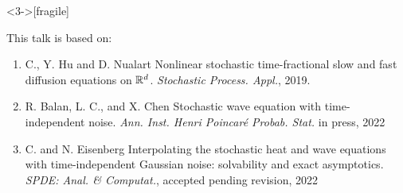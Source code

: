 \documentclass[9pt,table,xcolor=dvipsnames]{beamer}%
\begin{document}
\begin{frame}<3->[fragile] %
  \begin{center}
    This talk is based on:
  \end{center}
  \vfill

\footnotesize
\begin{enumerate}
  \item \textcolor{refcolor}{C., Y. Hu and D. Nualart} Nonlinear stochastic time-fractional slow and fast diffusion equations on $\mathbb{R}^d$. \textcolor{journal_color}{\em Stochastic Process. Appl.}, 2019.  \\[3em]
  \item \textcolor{refcolor}{R. Balan, L. C., and X. Chen}
    Stochastic wave equation with time-independent noise.
    \textcolor{journal_color}{\em Ann. Inst. Henri Poincar\'e Probab. Stat. } in press, 2022 \\[3em]
  \item \textcolor{refcolor}{C. and N. Eisenberg}
    Interpolating the stochastic heat and wave equations with time-independent
    Gaussian noise: solvability and exact asymptotics.
    \textcolor{journal_color}{\em SPDE: Anal. \& Computat.}, accepted pending revision, 2022
\end{enumerate}
\end{frame}
\end{document}
